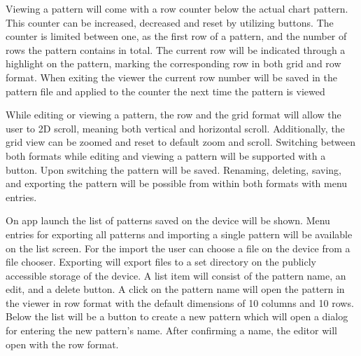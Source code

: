 Viewing a pattern will come with a row counter below the actual chart pattern. This counter can be increased, decreased and reset by utilizing buttons. The counter is limited between one, as the first row of a pattern, and the number of rows the pattern contains in total. The current row will be indicated through a highlight on the pattern, marking the corresponding row in both grid and row format. When exiting the viewer the current row number will be saved in the pattern file and applied to the counter the next time the pattern is viewed

While editing or viewing a pattern, the row and the grid format will allow the user to 2D scroll, meaning both vertical and horizontal scroll. Additionally, the grid view can be zoomed and reset to default zoom and scroll. Switching between both formats while editing and viewing a pattern will be supported with a button. Upon switching the pattern will be saved. Renaming, deleting, saving, and exporting the pattern will be possible from within both formats with menu entries.

On app launch the list of patterns saved on the device will be shown. Menu entries for exporting all patterns and importing a single pattern will be available on the list screen. For the import the user can choose a file on the device from a file chooser. Exporting will export files to a set directory on the publicly accessible storage of the device. A list item will consist of the pattern name, an edit, and a delete button. A click on the pattern name will open the pattern in the viewer in row format with the default dimensions of 10 columns and 10 rows. Below the list will be a button to create a new pattern which will open a dialog for entering the new pattern’s name. After confirming a name, the editor will open with the row format.


